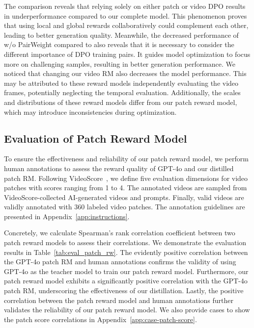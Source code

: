 The comparison reveals that relying solely on either patch or video DPO results in underperformance compared to our complete model. This phenomenon proves that using local and global rewards collaboratively could complement each other, leading to better generation quality. Meanwhile, the decreased performance of w/o PairWeight compared to \ours{} also reveals that it is necessary to consider the different importance of DPO training pairs. It guides model optimization to focus more on challenging samples, resulting in better generation performance. 
We noticed that changing our video RM also decreases the model performance. This may be attributed to these reward models independently evaluating the video frames, potentially neglecting the temporal evaluation. Additionally, the scales and distributions of these reward models differ from our patch reward model, which may introduce inconsistencies during optimization.  

\subsection{Evaluation of Patch Reward Model}\label{sec:human-eval}
To ensure the effectiveness and reliability of our patch reward model, we perform human annotations to assess the reward quality of GPT-4o and our distilled patch RM. Following VideoScore~\cite{VideoScore}, we define five evaluation dimensions for video patches with scores ranging from 1 to 4. The annotated videos are sampled from VideoScore-collected AI-generated videos and prompts. Finally, valid videos are validly annotated with 360 labeled video patches. The annotation guidelines are presented in Appendix~\ref{app:instructions}. 

Concretely, we calculate Spearman's rank correlation coefficient between two patch reward models to assess their correlations. We demonstrate the evaluation results in Table~\ref{tab:eval_patch_rw}. The evidently positive correlation between the GPT-4o patch RM and human annotations confirms the validity of using GPT-4o as the teacher model to train our patch reward model. Furthermore, our patch reward model exhibits a significantly positive correlation with the GPT-4o patch RM, underscoring the effectiveness of our distillation. Lastly, the positive correlation between the patch reward model and human annotations further validates the reliability of our patch reward model. We also provide cases to show the patch score correlations in Appendix~\ref{app:case-patch-score}.

